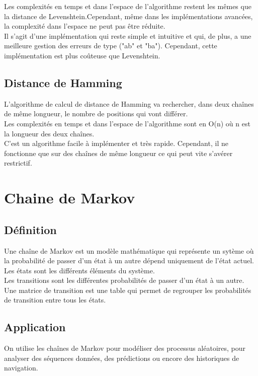 \documentclass[a4paper, 11pt]{report}
\begin{document}
Les complexités en temps et dans l'espace de l'algorithme restent les mêmes que la distance de Levenshtein.Cependant, même dans les implémentations avancées, la complexité dans l'espace ne peut pas être réduite. \\

Il s'agit d'une implémentation qui reste simple et intuitive et qui, de plus, a une meilleure gestion des erreurs de type ("ab" et "ba"). Cependant, cette implémentation est plus coûteuse que Levenshtein.  \\

\section{Distance de Hamming}

L'algorithme de calcul de distance de Hamming va rechercher, dans deux chaînes de même longueur, le nombre de positions qui vont différer. \\

Les complexités en temps et dans l'espace de l'algorithme sont en O(n) où n est la longueur des deux chaînes. \\

C'est un algorithme facile à implémenter et très rapide. Cependant, il ne fonctionne que sur des chaînes de même longueur ce qui peut vite s'avérer restrictif.\\

\chapter{Chaine de Markov}

\section{Définition}

Une chaîne de Markov est un modèle mathématique qui représente un sytème où la probabilité de passer d'un état à un autre dépend uniquement de l'état actuel. \\
Les états sont les différents éléments du système. \\
Les transitions sont les différentes probabilités de passer d'un état à un autre. \\
Une matrice de transition est une table qui permet de regrouper les probabilités de transition entre tous les états. \\

\section{Application}
On utilise les chaînes de Markov pour modéliser des processus aléatoires, pour analyser des séquences données, des prédictions ou encore des historiques de navigation. \\
\end{document}
